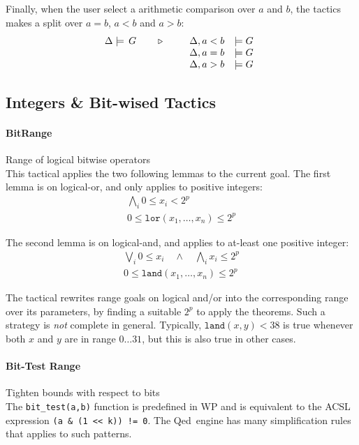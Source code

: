 Finally, when the user select a arithmetic comparison over $a$ and $b$,
the tactics makes a split over $a=b$, $a<b$ and $a>b$:
\[\TACTIC{\Delta\models\,G}{%
\begin{array}[t]{ll}
\Delta,a<b&\models G \\
\Delta,a=b&\models G \\
\Delta,a>b&\models G
\end{array}} \]

\subsection{Integers \& Bit-wised Tactics}

\paragraph{BitRange} Range of logical bitwise operators \\
This tactical applies the two following lemmas to the current goal.
The first lemma is on logical-or, and only applies to positive integers:
\[
\begin{array}{c}
  \bigwedge_i 0 \leq x_i < 2^p
  \\\hline
  0 \leq \mathtt{lor}(x_1,\ldots,x_n) \leq 2^p
\end{array}
\]

The second lemma is on logical-and, and applies to at-least one positive integer:
\[
\begin{array}{c}
  \bigvee_i 0 \leq x_i \quad\wedge\quad \bigwedge_i x_i \leq 2^p
  \\\hline
  0 \leq \mathtt{land}(x_1,\ldots,x_n) \leq 2^p
\end{array}
\]

The tactical rewrites range goals on logical and/or into the corresponding range over its parameters, by finding a suitable $2^p$
to apply the theorems. Such a strategy is \emph{not} complete in general.
Typically, $\mathtt{land}(x,y) < 38$ is true whenever both $x$ and $y$ are in range $0\ldots 31$, but this is also true
in other cases.

\paragraph{Bit-Test Range} Tighten bounds with respect to bits \\
The \lstinline{bit_test(a,b)} function is predefined in \textsf{WP} and is equivalent
to the \textsf{ACSL} expression \lstinline{(a & (1 << k)) != 0}. The
\textsf{Qed} engine has many simplification rules that applies to
such patterns.

